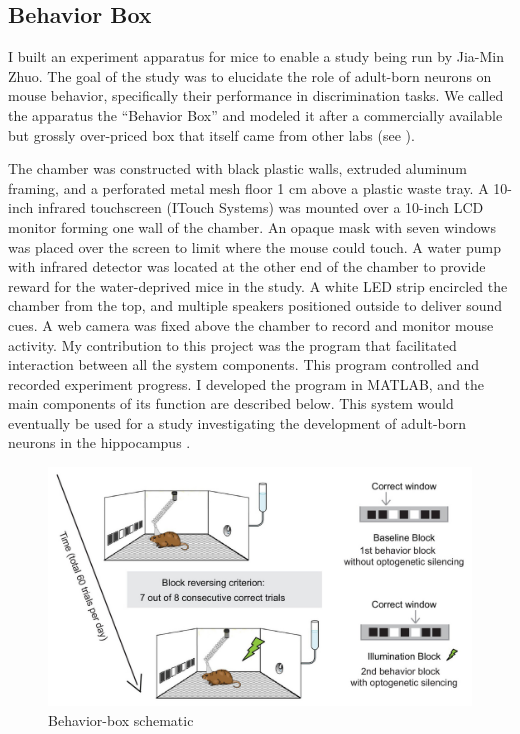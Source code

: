 \subsection{Behavior Box}\label{sec:behavior-box}

I built an experiment apparatus for mice to enable a study being run by Jia-Min Zhuo.
The goal of the study was to elucidate the role of adult-born neurons on mouse behavior, specifically their performance in discrimination tasks.
We called the apparatus the ``Behavior Box'' and modeled it after a commercially available but grossly over-priced box that itself came from other labs (see \cite{McLelland2015}).

The chamber was constructed with black plastic walls, extruded aluminum framing, and a perforated metal mesh floor 1 cm above a plastic waste tray.
A 10-inch infrared touchscreen (ITouch Systems) was mounted over a 10-inch LCD monitor forming one wall of the chamber.
An opaque mask with seven windows was placed over the screen to limit where the mouse could touch.
A water pump with infrared detector was located at the other end of the chamber to provide reward for the water-deprived mice in the study.
A white LED strip encircled the chamber from the top, and multiple speakers positioned outside to deliver sound cues.
A web camera was fixed above the chamber to record and monitor mouse activity.
My contribution to this project was the program that facilitated interaction between all the system components.
This program controlled and recorded experiment progress.
I developed the program in MATLAB, and the main components of its function are described below.
This system would eventually be used for a study investigating the development of adult-born neurons in the hippocampus \cite{Zhuo_2016}.

\begin{figure}
	\includegraphics[width=15cm]{figures/task-schematic.jpg}
	\caption{Behavior-box schematic}
	\label{fig:behaviorbox-schematic}
\end{figure}


